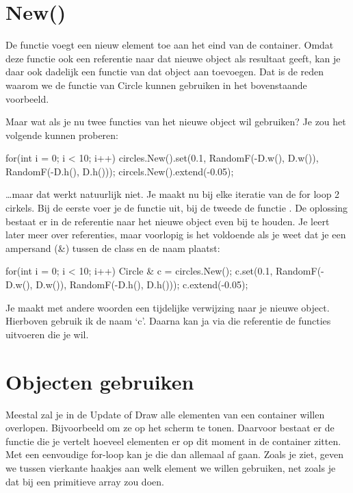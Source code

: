 \section{New()}
De functie  voegt een nieuw element toe aan het eind van de container. Omdat deze functie ook een referentie naar dat nieuwe object als resultaat geeft, kan je daar ook dadelijk een functie van dat object aan toevoegen. Dat is de reden waarom we de  functie van Circle kunnen gebruiken in het bovenstaande voorbeeld.

Maar wat als je nu twee functies van het nieuwe object wil gebruiken? Je zou het volgende kunnen proberen:

\begin{code}
for(int i = 0; i < 10; i++)
{
	circles.New().set(0.1, RandomF(-D.w(), D.w()), RandomF(-D.h(), D.h()));
	circels.New().extend(-0.05);
}
\end{code}

\ldots maar dat werkt natuurlijk niet. Je maakt nu bij elke iteratie van de for loop 2 cirkels. Bij de eerste voer je de functie  uit, bij de tweede de functie . De oplossing bestaat er in de referentie naar het nieuwe object even bij te houden. Je leert later meer over referenties, maar voorlopig is het voldoende als je weet dat je een ampersand (\&) tussen de class en de naam plaatst:

\begin{code}
for(int i = 0; i < 10; i++)
{
	Circle & c = circles.New();
	c.set(0.1, RandomF(-D.w(), D.w()), RandomF(-D.h(), D.h()));
	c.extend(-0.05);
}
\end{code}

Je maakt met andere woorden een tijdelijke verwijzing naar je nieuwe object. Hierboven gebruik ik de naam `c'. Daarna kan ja via die referentie de functies uitvoeren die je wil.

\section{Objecten gebruiken}
Meestal zal je in de Update of Draw alle elementen van een container willen overlopen. Bijvoorbeeld om ze op het scherm te tonen. Daarvoor bestaat er de functie  die je vertelt hoeveel elementen er op dit moment in de container zitten. Met een eenvoudige for-loop kan je die dan allemaal af gaan. Zoals je ziet, geven we tussen vierkante haakjes aan welk element we willen gebruiken, net zoals je dat bij een primitieve array zou doen.

